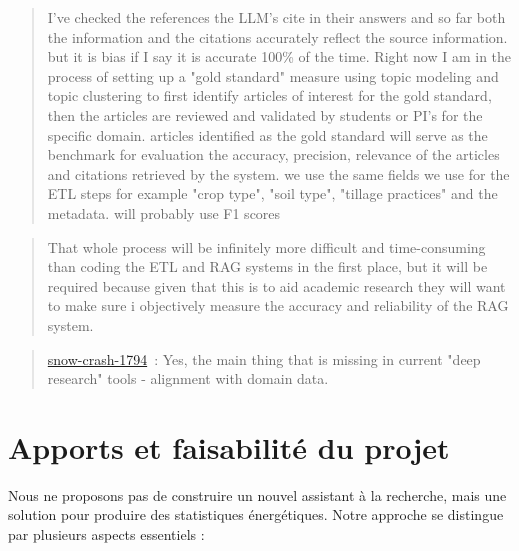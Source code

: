 \documentclass[a4paper,11pt]{report}
\begin{document}
\begin{quote}
I've checked the references the LLM's cite in their answers and so far both the information and the citations accurately reflect the source information. but it is bias if I say it is accurate 100\% of the time. Right now I am in the process of setting up a "gold standard" measure using topic modeling and topic clustering to first identify articles of interest for the gold standard, then the articles are reviewed and validated by students or PI's for the specific domain. articles identified as the gold standard will serve as the benchmark for evaluation the accuracy, precision, relevance of the articles and citations retrieved by the system. we use the same fields we use for the ETL steps for example "crop type", "soil type", "tillage practices" and the metadata. will probably use F1 scores
\end{quote}

\begin{quote}
That whole process will be infinitely more difficult and time-consuming than coding the ETL and RAG systems in the first place, but it will be required because given that this is to aid academic research they will want to make sure i objectively measure the accuracy and reliability of the RAG system.
\end{quote}

\begin{quote}
\href{https://www.reddit.com/user/snow-crash-1794/}{snow-crash-1794}~: Yes, the main thing that is missing in current "deep research" tools - alignment with domain data.
\end{quote}

\section{Apports et faisabilité du projet}\label{apports-et-faisabilituxe9-du-projet}

Nous ne proposons pas de construire un nouvel assistant à la recherche, mais une solution pour produire des statistiques énergétiques. Notre approche se distingue par plusieurs aspects essentiels :
\end{document}
